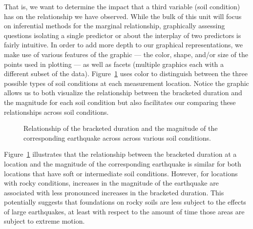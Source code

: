 \documentclass[
  letterpaper,
  DIV=11,
  numbers=noendperiod]{scrreprt}
\theoremstyle{plain}
\theoremstyle{definition}
\theoremstyle{definition}
\theoremstyle{remark}
\begin{document}
That is, we want to determine the impact that a third variable (soil
condition) has on the relationship we have observed. While the bulk of
this unit will focus on inferential methods for the marginal
relationship, graphically assessing questions isolating a single
predictor or about the interplay of two predictors is fairly intuitive.
In order to add more depth to our graphical representations, we make use
of various features of the graphic --- the color, shape, and/or size of
the points used in plotting --- as well as facets (multiple graphics
each with a different subset of the data).
Figure~\ref{fig-regsummaries-color} uses color to distinguish between
the three possible types of soil conditions at each measurement
location. Notice the graphic allows us to both visualize the
relationship between the bracketed duration and the magnitude for each
soil condition but also facilitates our comparing these relationships
across soil conditions.

\begin{figure}


\caption{\label{fig-regsummaries-color}Relationship of the bracketed
duration and the magnitude of the corresponding earthquake across across
various soil conditions.}

\end{figure}%

Figure~\ref{fig-regsummaries-color} illustrates that the relationship
between the bracketed duration at a location and the magnitude of the
corresponding earthquake is similar for both locations that have soft or
intermediate soil conditions. However, for locations with rocky
conditions, increases in the magnitude of the earthquake are associated
with less pronounced increases in the bracketed duration. This
potentially suggests that foundations on rocky soils are less subject to
the effects of large earthquakes, at least with respect to the amount of
time those areas are subject to extreme motion.
\end{document}
